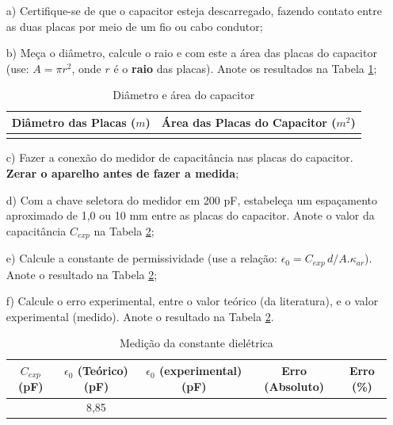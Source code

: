 	\begin{itemize}
		\item[a)] Certifique-se de que o capacitor esteja descarregado, fazendo contato entre as duas placas por meio de um fio ou cabo condutor;
		\item[b)] Meça o diâmetro, calcule o raio e com este a área das placas do capacitor (use: $A=\pi r^2$, onde $r$ é o \textbf{raio} das placas). Anote os resultados na Tabela \ref{tab:area-placas};
		
		\begin{table}[H]
			\centering
		\begin{tabular}{|c|c|}
			\hline 
			Diâmetro das Placas ($m$) & Área das Placas do Capacitor ($m^2$)\\ 
			\hline
			&  \\ 
			\hline 
		\end{tabular}
			\caption{\label{tab:area-placas} Diâmetro e área do capacitor}
		\end{table}
		
		\item[c)] Fazer a conexão do medidor de capacitância nas placas do capacitor. \textbf{Zerar o aparelho antes de fazer a medida};
		\item[d)] Com a chave seletora do medidor em 200 pF, estabeleça um espaçamento aproximado de 1,0 ou 10 mm entre as placas do capacitor. Anote o valor da capacitância $C_{exp}$ na Tabela \ref{tab:cte-dieletrica}; 
		\item[e)] Calcule a constante de permissividade (use a relação: $ \epsilon_{0}= C_{exp} \, d / A. \kappa_{ar} $). Anote o resultado na Tabela \ref{tab:cte-dieletrica};
		\item[f)] Calcule o erro experimental, entre o valor teórico (da literatura), e o valor experimental (medido). Anote o resultado na Tabela \ref{tab:cte-dieletrica}. 
	
		\begin{table}[H]
			\centering
		\begin{tabular}{|c|c|c|c|c|}
			\hline 
			$C_{exp}$ (pF) & $\epsilon_{0}$ (Teórico)(pF) & $\epsilon_{0}$ (experimental)(pF) & Erro (Absoluto) & Erro (\%)  \\ 
			\hline 
			& 8,85 & & & \\ 
			\hline 
		\end{tabular}
			\caption{Medição da constante dielétrica}
			\label{tab:cte-dieletrica}
		\end{table} 
	\end{itemize}
	
